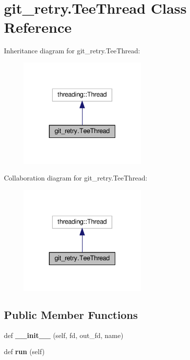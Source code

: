 \hypertarget{classgit__retry_1_1TeeThread}{}\section{git\+\_\+retry.\+Tee\+Thread Class Reference}
\label{classgit__retry_1_1TeeThread}


Inheritance diagram for git\+\_\+retry.\+Tee\+Thread\+:
\nopagebreak
\begin{figure}[H]
\begin{center}
\leavevmode
\includegraphics[width=181pt]{classgit__retry_1_1TeeThread__inherit__graph}
\end{center}
\end{figure}


Collaboration diagram for git\+\_\+retry.\+Tee\+Thread\+:
\nopagebreak
\begin{figure}[H]
\begin{center}
\leavevmode
\includegraphics[width=181pt]{classgit__retry_1_1TeeThread__coll__graph}
\end{center}
\end{figure}
\subsection*{Public Member Functions}
\begin{DoxyCompactItemize}
\item 
\mbox{\label{classgit__retry_1_1TeeThread_a97812bafffa2d31ea55199c5d1b467b9}} 
def {\bfseries \+\_\+\+\_\+init\+\_\+\+\_\+} (self, fd, out\+\_\+fd, name)
\item 
\mbox{\label{classgit__retry_1_1TeeThread_a54f14621de06e7bac3c444029e3e044c}} 
def {\bfseries run} (self)
\end{DoxyCompactItemize}

